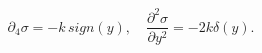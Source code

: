 \begin{equation}\label{sigma}
  \partial_4 \sigma = -k\, sign(y), \quad \frac{\partial^2 \sigma}{\partial
  {y}^2} =-2k\delta(y).
\end{equation}

